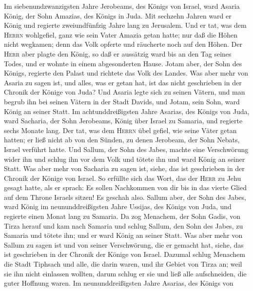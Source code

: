  Im siebenundzwanzigsten Jahre Jerobeams, des Königs von
Israel, ward Asaria König, der Sohn Amazias, des Königs in Juda.
 Mit sechzehn Jahren ward er König und regierte
zweiundfünfzig Jahre lang zu Jerusalem.  Und er tat, was
dem \textsc{Herrn} wohlgefiel, ganz wie sein Vater Amazia getan hatte;
 nur daß die Höhen nicht wegkamen; denn das Volk opferte
und räucherte noch auf den Höhen.  Der \textsc{Herr} aber
plagte den König, so daß er aussätzig ward bis an den Tag seines Todes,
und er wohnte in einem abgesonderten Hause. Jotam aber, der Sohn des
Königs, regierte den Palast und richtete das Volk des Landes.
 Was aber mehr von Asaria zu sagen ist, und alles, was er
getan hat, ist das nicht geschrieben in der Chronik der Könige von Juda?
 Und Asaria legte sich zu seinen Vätern, und man begrub
ihn bei seinen Vätern in der Stadt Davids, und Jotam, sein Sohn, ward
König an seiner Statt.  Im achtunddreißigsten Jahre
Asarias, des Königs von Juda, ward Sacharia, der Sohn Jerobeams, König
über Israel zu Samaria, und regierte sechs Monate lang. 
Der tat, was dem \textsc{Herrn} übel gefiel, wie seine Väter getan
hatten; er ließ nicht ab von den Sünden, zu denen Jerobeam, der Sohn
Nebats, Israel verführt hatte.  Und Sallum, der Sohn des
Jabes, machte eine Verschwörung wider ihn und schlug ihn vor dem Volk
und tötete ihn und ward König an seiner Statt.  Was aber
mehr von Sacharia zu sagen ist, siehe, das ist geschrieben in der
Chronik der Könige von Israel.  So erfüllte sich das
Wort, das der \textsc{Herr} zu Jehu gesagt hatte, als er sprach: Es
sollen Nachkommen von dir bis in das vierte Glied auf dem Throne Israels
sitzen! Es geschah also.  Sallum aber, der Sohn des
Jabes, ward König im neununddreißigsten Jahre Ussijas, des Königs von
Juda, und regierte einen Monat lang zu Samaria.  Da zog
Menachem, der Sohn Gadis, von Tirza herauf und kam nach Samaria und
schlug Sallum, den Sohn des Jabes, zu Samaria und tötete ihn; und er
ward König an seiner Statt.  Was aber mehr von Sallum zu
sagen ist und von seiner Verschwörung, die er gemacht hat, siehe, das
ist geschrieben in der Chronik der Könige von Israel. 
Dazumal schlug Menachem die Stadt Tiphsach und alle, die darin waren,
und ihr Gebiet von Tirza an; weil sie ihn nicht einlassen wollten, darum
schlug er sie und ließ alle aufschneiden, die guter Hoffnung waren.
 Im neununddreißigsten Jahre Asarias, des Königs von
